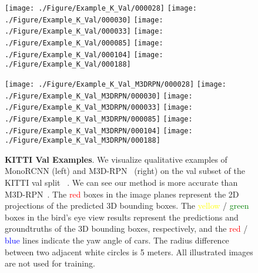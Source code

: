 \documentclass[10pt,twocolumn,letterpaper]{article}
\begin{document}
\begin{figure*}
\begin{minipage}{0.5\linewidth}
\centering
\texttt{[image: ./Figure/Example\_K\_Val/000028]}
\texttt{[image: ./Figure/Example\_K\_Val/000030]}
\texttt{[image: ./Figure/Example\_K\_Val/000033]}
\texttt{[image: ./Figure/Example\_K\_Val/000085]}
\texttt{[image: ./Figure/Example\_K\_Val/000104]}
\texttt{[image: ./Figure/Example\_K\_Val/000188]}
\end{minipage}
\begin{minipage}{0.5\linewidth}
\centering
\texttt{[image: ./Figure/Example\_K\_Val\_M3DRPN/000028]}
\texttt{[image: ./Figure/Example\_K\_Val\_M3DRPN/000030]}
\texttt{[image: ./Figure/Example\_K\_Val\_M3DRPN/000033]}
\texttt{[image: ./Figure/Example\_K\_Val\_M3DRPN/000085]}
\texttt{[image: ./Figure/Example\_K\_Val\_M3DRPN/000104]}
\texttt{[image: ./Figure/Example\_K\_Val\_M3DRPN/000188]}
\end{minipage}
\caption{\textbf{KITTI Val Examples}. We visualize qualitative examples of MonoRCNN (left) and M3D-RPN~\cite{DBLP:conf/iccv/Brazil019} (right) on the val subset of the KITTI val split ~\cite{DBLP:conf/nips/ChenKZBMFU15}. We can see our method is more accurate than M3D-RPN~\cite{DBLP:conf/iccv/Brazil019}. The \textcolor{red}{red} boxes in the image planes represent the 2D projections of the predicted 3D bounding boxes. The \textcolor{yellow}{yellow} / \textcolor{green}{green} boxes in the bird's eye view results represent the predictions and groundtruths of the 3D bounding boxes, respectively, and the \textcolor{red}{red} / \textcolor{blue}{blue} lines indicate the yaw angle of cars. The radius difference between two adjacent white circles is \num{5} meters. All illustrated images are not used for training.}
\label{fig:Example_K_MA}
\end{figure*}
\end{document}
